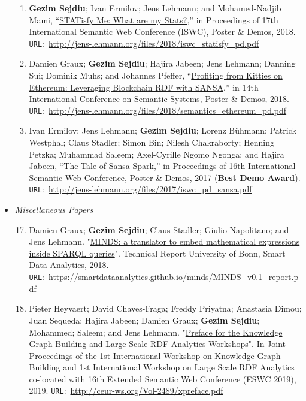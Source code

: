 \begin{itemize}
\begin{enumerate}
    \item \textbf{Gezim Sejdiu}; Ivan Ermilov; Jens Lehmann; and Mohamed-Nadjib Mami, “\href{http://jens-lehmann.org/files/2018/iswc_statisfy_pd.pdf}{STATisfy Me: What are my Stats?},” in Proceedings of 17th International Semantic Web Conference (ISWC), Poster \& Demos, 2018. \texttt{URL}:~\url{http://jens-lehmann.org/files/2018/iswc_statisfy_pd.pdf}
    
    \item Damien Graux; \textbf{Gezim Sejdiu}; Hajira Jabeen; Jens Lehmann; Danning Sui; Dominik Muhs; and Johannes Pfeffer, “\href{http://jens-lehmann.org/files/2018/semantics_ethereum_pd.pdf}{Profiting from Kitties on Ethereum: Leveraging Blockchain RDF with SANSA},” in 14th International Conference on Semantic Systems, Poster \& Demos, 2018. \texttt{URL}:~\url{http://jens-lehmann.org/files/2018/semantics_ethereum_pd.pdf}
    
    \item Ivan Ermilov; Jens Lehmann; \textbf{Gezim Sejdiu}; Lorenz Bühmann; Patrick Westphal; Claus Stadler; Simon Bin; Nilesh Chakraborty; Henning Petzka; Muhammad Saleem; Axel-Cyrille Ngomo Ngonga; and Hajira Jabeen, “\href{http://jens-lehmann.org/files/2017/iswc_pd_sansa.pdf}{The Tale of Sansa Spark},” in Proceedings of 16th International Semantic Web Conference, Poster \& Demos, 2017 ({\color{darkred}\textbf{Best Demo Award}}). \texttt{URL}:~\url{http://jens-lehmann.org/files/2017/iswc_pd_sansa.pdf}
        
    \end{enumerate}
    
\item \emph{Miscellaneous Papers}

    \begin{enumerate}
    \setcounter{enumi}{16}
    
    \item Damien Graux; \textbf{Gezim Sejdiu}; Claus Stadler; Giulio Napolitano; and Jens Lehmann. "\href{https://smartdataanalytics.github.io/minds/MINDS_v0.1_report.pdf}{MINDS: a translator to embed mathematical expressions inside SPARQL queries}". Technical Report University of Bonn, Smart Data Analytics, 2018. 
    \texttt{URL}:~\url{https://smartdataanalytics.github.io/minds/MINDS_v0.1_report.pdf}
    
    \item Pieter Heyvaert; David Chaves-Fraga; Freddy Priyatna; Anastasia Dimou; Juan Sequeda; Hajira Jabeen; Damien Graux; \textbf{Gezim Sejdiu}; Mohammed; Saleem; and Jens Lehmann. "\href{http://ceur-ws.org/Vol-2489/xpreface.pdf}{Preface for the Knowledge Graph Building and Large Scale RDF Analytics Workshops}". In Joint Proceedings of the 1st International Workshop on Knowledge Graph Building and 1st International Workshop on Large Scale RDF Analytics co-located with 16th Extended Semantic Web Conference (ESWC 2019), 2019.
    \texttt{URL}:~\url{http://ceur-ws.org/Vol-2489/xpreface.pdf}


\end{enumerate}
\end{itemize}

